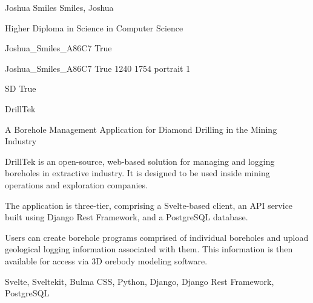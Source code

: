 \documentclass[twoside]{report}
\begin{document}
\begingroup{}\relax



\def\Key{Joshua_Smiles_A86C7}

{Joshua Smiles}
{Smiles, Joshua}

{Higher Diploma in Science in Computer Science}

{Joshua_Smiles_A86C7}
{True}

{Joshua_Smiles_A86C7}
{True}
{1240}
{1754}
{portrait}
{1}

{SD}
{True}

{DrillTek}

{A Borehole Management Application for Diamond Drilling in the Mining Industry}

{DrillTek is an open-source, web-based solution for managing and logging boreholes in extractive industry. It is designed to be used inside mining operations and exploration companies.

The application is three-tier, comprising a Svelte-based client, an API service built using Django Rest Framework, and a PostgreSQL database.

Users can create borehole programs comprised of individual boreholes and upload geological logging information associated with them. This information is then available for access via 3D orebody modeling software.}

{Svelte, Sveltekit, Bulma CSS, Python, Django, Django Rest Framework, PostgreSQL}
\end{document}
